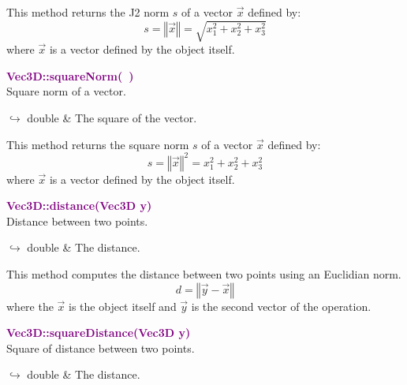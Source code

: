 This method returns the J2 norm $s$ of a vector $\overrightarrow{x}$ defined by:
\begin{equation*}
s = \left\Vert \overrightarrow{x} \right\Vert  = \sqrt {x_{1}^2 + x_{2}^2 + x_{3}^2}
\end{equation*}
where $\overrightarrow{x}$ is a vector defined by the object itself.

\textcolor{purple}{\textbf{Vec3D::squareNorm(~)}}\label{Vec3D::squareNorm()}\\
Square norm of a vector.\vspace*{-0.5em}
\begin{tcolorbox}[grow to left by=-1cm, width=\textwidth-1cm,myArgs,tabularx={l|R}]
$\hookrightarrow$ double & The square of the vector.
\end{tcolorbox}

This method returns the square norm $s$ of a vector $\overrightarrow{x}$ defined by:
\begin{equation*}
s = \left\Vert \overrightarrow{x} \right\Vert^2  = {x_{1}^2 + x_{2}^2 + x_{3}^2}
\end{equation*}
where $\overrightarrow{x}$ is a vector defined by the object itself.

\textcolor{purple}{\textbf{Vec3D::distance(Vec3D y)}}\label{Vec3D::distance(Vec3D y)}\\
Distance between two points.\vspace*{-0.5em}
\begin{tcolorbox}[grow to left by=-1cm, width=\textwidth-1cm,myArgs,tabularx={l|R}]
$\hookrightarrow$ double & The distance.
\end{tcolorbox}

This method computes the distance between two points using an Euclidian norm.
\begin{equation*}
d = \left\Vert \overrightarrow{y} - \overrightarrow{x} \right\Vert
\end{equation*}
where the $\overrightarrow{x}$ is the object itself and $\overrightarrow{y}$ is the second vector of the operation.

\textcolor{purple}{\textbf{Vec3D::squareDistance(Vec3D y)}}\label{Vec3D::squareDistance(Vec3D y)}\\
Square of distance between two points.\vspace*{-0.5em}
\begin{tcolorbox}[grow to left by=-1cm, width=\textwidth-1cm,myArgs,tabularx={l|R}]
$\hookrightarrow$ double & The distance.
\end{tcolorbox}

